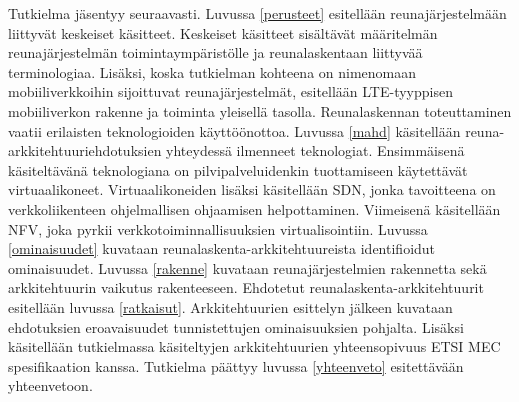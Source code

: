 Tutkielma jäsentyy seuraavasti. Luvussa \ref{perusteet} esitellään reunajärjestelmään liittyvät keskeiset käsitteet. 
Keskeiset käsitteet sisältävät määritelmän reunajärjestelmän toimintaympäristölle ja reunalaskentaan liittyvää terminologiaa.
Lisäksi, koska tutkielman kohteena on nimenomaan mobiiliverkkoihin sijoittuvat reunajärjestelmät, esitellään LTE-tyyppisen mobiiliverkon rakenne ja toiminta yleisellä tasolla.
Reunalaskennan toteuttaminen vaatii erilaisten teknologioiden käyttöönottoa. Luvussa \ref{mahd} käsitellään reuna-arkkitehtuuriehdotuksien yhteydessä ilmenneet teknologiat. Ensimmäisenä käsiteltävänä teknologiana on pilvipalveluidenkin tuottamiseen käytettävät virtuaalikoneet.
Virtuaalikoneiden lisäksi käsitellään SDN, jonka tavoitteena on  verkkoliikenteen ohjelmallisen ohjaamisen helpottaminen. 
Viimeisenä käsitellään NFV, joka pyrkii verkkotoiminnallisuuksien virtualisointiin.
Luvussa \ref{ominaisuudet} kuvataan reunalaskenta-arkkitehtuureista identifioidut ominaisuudet.
Luvussa \ref{rakenne} kuvataan reunajärjestelmien rakennetta sekä arkkitehtuurin vaikutus rakenteeseen.
Ehdotetut reunalaskenta-arkkitehtuurit esitellään luvussa \ref{ratkaisut}. Arkkitehtuurien esittelyn jälkeen kuvataan ehdotuksien eroavaisuudet tunnistettujen ominaisuuksien pohjalta. Lisäksi käsitellään tutkielmassa käsiteltyjen arkkitehtuurien yhteensopivuus ETSI MEC spesifikaation kanssa.
Tutkielma päättyy luvussa \ref{yhteenveto} esitettävään yhteenvetoon.

